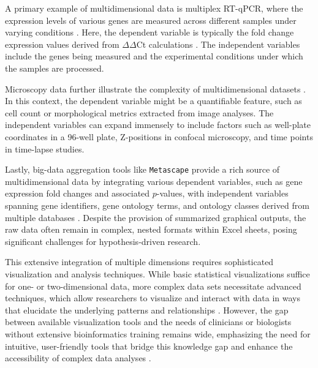 
A primary example of multidimensional data is multiplex RT-qPCR, where the
expression levels of various genes are measured across different samples under
varying conditions \cite{bustinReproducibilityBiomedicalResearch2014}. Here, the dependent variable is typically the fold change
expression values derived from $\Delta\Delta$Ct calculations
\cite{brankatschkSimpleAbsoluteQuantification2012}. The independent variables
include the genes being measured and the experimental conditions under which the
samples are processed.

Microscopy data further illustrate the complexity of multidimensional datasets
\cite{ruedenImageJ2ImageJNext2017}. In this context, the dependent variable
might be a quantifiable feature, such as cell count or morphological metrics
extracted from image analyses. The independent variables can expand immensely to
include factors such as well-plate coordinates in a 96-well plate, Z-positions
in confocal microscopy, and time points in time-lapse studies.

Lastly, big-data aggregation tools like \texttt{Metascape} provide a rich source
of multidimensional data by integrating various dependent variables, such as
gene expression fold changes and associated $p$-values, with independent variables
spanning gene identifiers, gene ontology terms, and ontology classes derived from
multiple databases \cite{zhouMetascapeProvidesBiologistoriented2019}. Despite
the provision of summarized graphical outputs, the raw data often remain in
complex, nested formats within Excel sheets, posing significant challenges for
hypothesis-driven research.

This extensive integration of multiple dimensions requires sophisticated
visualization and analysis techniques. While basic statistical visualizations
suffice for one- or two-dimensional data, more complex data sets necessitate
advanced techniques, which allow researchers to visualize and interact with data
in ways that elucidate the underlying patterns and relationships
\cite{dunnExploringVisualizingMultidimensional2017}. However, the gap between
available visualization tools and the needs of clinicians or biologists without
extensive bioinformatics training remains wide, emphasizing the need for
intuitive, user-friendly tools that bridge this knowledge gap and enhance the
accessibility of complex data analyses
\cite{dunnExploringVisualizingMultidimensional2017}.




